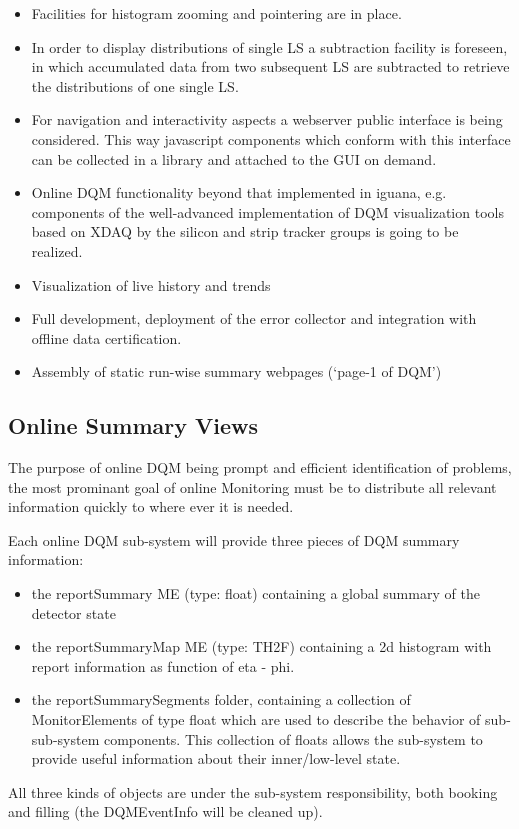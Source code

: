 \begin{itemize}
\begin{itemize}
\item Facilities for histogram zooming and pointering are in place.
\item In order to display distributions of single LS a subtraction facility is foreseen, in which accumulated data from two subsequent LS are subtracted to retrieve the distributions of one single LS.
\item For navigation and interactivity aspects a webserver public interface is being considered. This way javascript components which conform with this interface can be collected in a library and attached to the GUI on demand.
\item Online DQM functionality beyond that implemented in iguana, e.g.\,components of the well-advanced implementation of DQM visualization tools based on XDAQ by the silicon and strip tracker groups is going to be realized. 
\item Visualization of live history and trends %
\item Full development, deployment of the error collector
and integration with offline data certification.
\item Assembly of static run-wise summary webpages (`page-1 of DQM')
\end{itemize}
\end{itemize}

\subsection{Online Summary Views}
\label{sec:summary}

The purpose of online DQM being prompt and efficient identification of problems, the most prominant goal of online Monitoring must be to distribute all relevant information quickly to where ever it is needed.

Each online DQM sub-system will provide three pieces of DQM summary information:
\begin{itemize}
\item the reportSummary ME (type: float) containing a global summary of the detector state
\item the reportSummaryMap ME (type: TH2F) containing a 2d histogram with report information as function of eta - phi.
\item the reportSummarySegments folder, containing a collection of MonitorElements of type float which are used to describe the behavior of sub-sub-system components. This collection of floats allows the sub-system to provide useful information about their inner/low-level state.
\end{itemize}
All three kinds of objects are under the sub-system responsibility, both booking and filling (the DQMEventInfo will be cleaned up).

